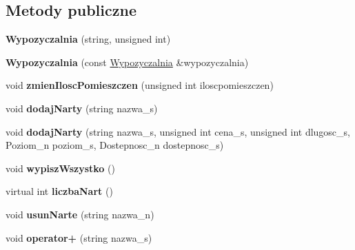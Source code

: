\subsection*{Metody publiczne}
\begin{DoxyCompactItemize}
\item 
\mbox{\label{class_wypozyczalnia_afa521c8f4087a3587af1597de6d1d67c}} 
{\bfseries Wypozyczalnia} (string, unsigned int)
\item 
\mbox{\label{class_wypozyczalnia_aef0b87f9ab0a39e8384e48d3d80503ad}} 
{\bfseries Wypozyczalnia} (const \hyperlink{class_wypozyczalnia}{Wypozyczalnia} \&wypozyczalnia)
\item 
\mbox{\label{class_wypozyczalnia_ad341700b6cfc7de365475a210b2a9bdb}} 
void {\bfseries zmien\+Ilosc\+Pomieszczen} (unsigned int iloscpomieszczen)
\item 
\mbox{\label{class_wypozyczalnia_a1de447b411ead2785381ee0293937a32}} 
void {\bfseries dodaj\+Narty} (string nazwa\+\_\+s)
\item 
\mbox{\label{class_wypozyczalnia_ac7adef1f4f60b4b99a8853910936fc5e}} 
void {\bfseries dodaj\+Narty} (string nazwa\+\_\+s, unsigned int cena\+\_\+s, unsigned int dlugosc\+\_\+s, Poziom\+\_\+n poziom\+\_\+s, Dostepnosc\+\_\+n dostepnosc\+\_\+s)
\item 
\mbox{\label{class_wypozyczalnia_a09beac2dbecfae112a9ea873485218bd}} 
void {\bfseries wypisz\+Wszystko} ()
\item 
\mbox{\label{class_wypozyczalnia_a47b50362048a34c2be7de80d9fc79b26}} 
virtual int {\bfseries liczba\+Nart} ()
\item 
\mbox{\label{class_wypozyczalnia_a23adfc6602609355a82a9597b6e27d14}} 
void {\bfseries usun\+Narte} (string nazwa\+\_\+n)
\item 
\mbox{\label{class_wypozyczalnia_a0ca06cb1a024785c467b90f4c0c1ce39}} 
void {\bfseries operator+} (string nazwa\+\_\+s)
\end{DoxyCompactItemize}
